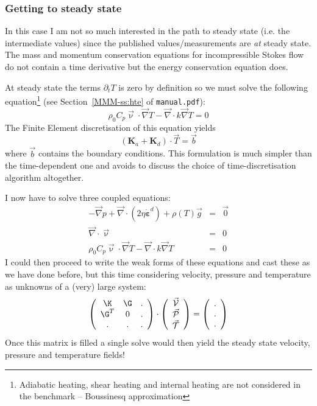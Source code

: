 \subsubsection{Getting to steady state}  

In this case I am not so much interested in the path to steady state (i.e.
the intermediate values) since the published values/measurements are {\it at} steady state.
The mass and momentum conservation equations for incompressible Stokes flow do not 
contain a time derivative but the energy conservation equation does. 

At steady state the terms $\partial_t T$ is zero by definition so we must solve
the following equation\footnote{Adiabatic heating, shear heating and internal heating 
are not considered in the benchmark -- Boussinesq approximation} (see 
Section~\ref{MMM-ss:hte} of {\tt manual.pdf}):
\begin{equation}
\rho_0 C_p
\vec{\upnu}\cdot\vec\nabla T - {\vec \nabla} \cdot k {\vec \nabla} T = 0
\end{equation}
The Finite Element discretisation of this equation yields 
\[
({\bm K}_a + {\bm K}_d) \cdot \vec{T} = \vec{b}
\]
where $\vec{b}$ contains the boundary conditions.
This formulation is much simpler than the time-dependent one and avoids to discuss the choice
of time-discretisation algorithm altogether. 

I now have to solve three coupled equations:
\begin{eqnarray}
-{\vec \nabla}p + {\vec \nabla}\cdot (2 \eta \dot{\bm \varepsilon}^d ) + \rho(T) {\vec g} &=& \vec{0} \\
{\vec \nabla}\cdot{\vec \upnu} &=& 0 \\ 
\rho_0 C_p \vec{\upnu}\cdot\vec\nabla T - {\vec \nabla} \cdot k {\vec \nabla} T &=& 0 
\end{eqnarray}
I could then proceed to write the weak forms of these equations and cast these as we have done before, 
but this time considering velocity, pressure and temperature as unknowns of a (very) large system:
\[
\left(
\begin{array}{ccc}
\K & \G & . \\
\G^T & 0 & . \\
. & . & . 
\end{array}
\right)
\cdot
\left(
\begin{array}{c}
\vec{\cal V} \\ \vec{\cal P} \\ \vec{\cal T}
\end{array}
\right)
=
\left(
\begin{array}{c}
. \\ . \\ .
\end{array}
\right)
\]
Once this matrix is filled a single solve would then yield the steady state velocity, pressure and 
temperature fields! 

